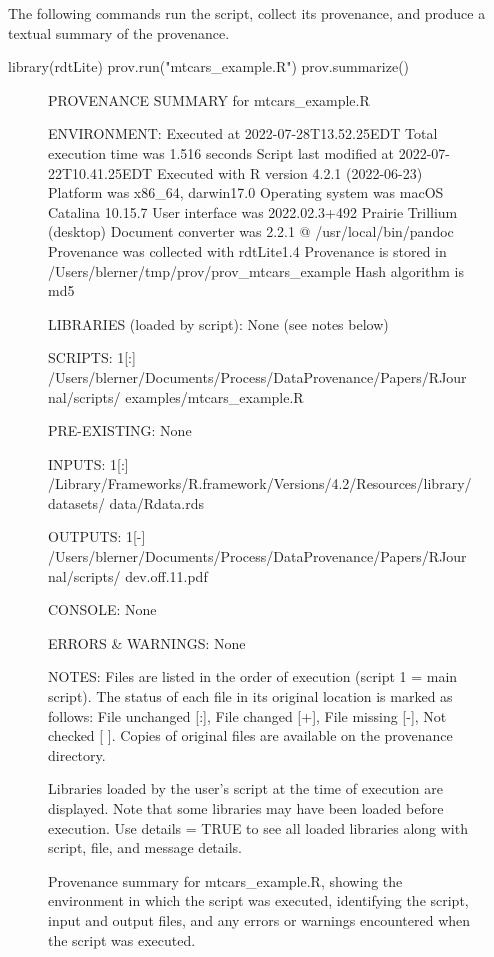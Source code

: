 The following commands run the script, collect its provenance, and produce a textual summary of the provenance.
\begin{example}
library(rdtLite)
prov.run("mtcars_example.R")
prov.summarize()
\end{example}

%

\begin{figure}[htbp]
    \begin{example}
PROVENANCE SUMMARY for mtcars_example.R

ENVIRONMENT:
Executed at 2022-07-28T13.52.25EDT
Total execution time was 1.516 seconds
Script last modified at 2022-07-22T10.41.25EDT
Executed with R version 4.2.1 (2022-06-23)
Platform was x86_64, darwin17.0
Operating system was macOS Catalina 10.15.7
User interface was 2022.02.3+492 Prairie Trillium (desktop)
Document converter was 2.2.1 @ /usr/local/bin/pandoc
Provenance was collected with rdtLite1.4
Provenance is stored in /Users/blerner/tmp/prov/prov_mtcars_example
Hash algorithm is md5

LIBRARIES (loaded by script):
None (see notes below)

SCRIPTS:
1[:] /Users/blerner/Documents/Process/DataProvenance/Papers/RJournal/scripts/
    examples/mtcars_example.R

PRE-EXISTING:
None

INPUTS:
1[:] /Library/Frameworks/R.framework/Versions/4.2/Resources/library/datasets/
    data/Rdata.rds

OUTPUTS:
1[-] /Users/blerner/Documents/Process/DataProvenance/Papers/RJournal/scripts/
    dev.off.11.pdf

CONSOLE:
None

ERRORS & WARNINGS:
None

NOTES: Files are listed in the order of execution (script 1 = main script).
The status of each file in its original location is marked as follows:
File unchanged [:], File changed [+], File missing [-], Not checked [ ].
Copies of original files are available on the provenance directory.

Libraries loaded by the user's script at the time of execution are displayed.
Note that some libraries may have been loaded before execution. Use details = 
TRUE to see all loaded libraries along with script, file, and message details.
    \end{example}
    \caption{Provenance summary for mtcars\_example.R, showing the environment in which the script was executed, identifying the script, input and output files, and any errors or warnings encountered when the script was executed.}
    \label{listing:car-summarize-output}
\end{figure}

